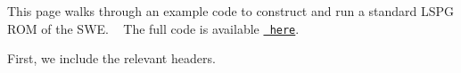 

\begin{DoxyParagraph}{}
This page walks through an example code to construct and run a standard L\+S\+PG R\+OM of the S\+WE. ~\newline
 The full code is available \href{https://github.com/Pressio/pressio-tutorials/blob/swe2d_tutorial/tutorials/swe2d/online_phase/lspg_rom/run_lspg.cc}{\texttt{ here}}.
\end{DoxyParagraph}
First, we include the relevant headers. 
\begin{DoxyCode}{0}
\end{DoxyCode}


